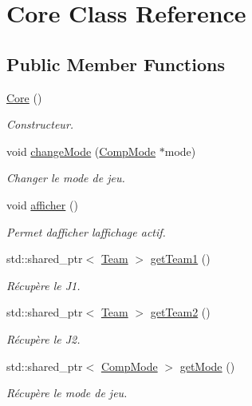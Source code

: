 \hypertarget{class_core}{}\section{Core Class Reference}
\label{class_core}
\subsection*{Public Member Functions}
\begin{DoxyCompactItemize}
\item 
\hyperlink{class_core_a14e63188e0aa7c4a6f72d5501384d1f9}{Core} ()
\begin{DoxyCompactList}\small\item\em Constructeur. \end{DoxyCompactList}\item 
void \hyperlink{class_core_aefcf76351ec813fb99f39fbcce42afac}{change\+Mode} (\hyperlink{class_comp_mode}{Comp\+Mode} $\ast$mode)
\begin{DoxyCompactList}\small\item\em Changer le mode de jeu. \end{DoxyCompactList}\item 
void \hyperlink{class_core_aeb0646c87941a9120d85bbe3f5fb8700}{afficher} ()
\begin{DoxyCompactList}\small\item\em Permet d\textquotesingle{}afficher l\textquotesingle{}affichage actif. \end{DoxyCompactList}\item 
std\+::shared\+\_\+ptr$<$ \hyperlink{class_team}{Team} $>$ \hyperlink{class_core_ab8696ef45b3d2d52ffbbe8a591dc99fb}{get\+Team1} ()
\begin{DoxyCompactList}\small\item\em Récupère le J1. \end{DoxyCompactList}\item 
std\+::shared\+\_\+ptr$<$ \hyperlink{class_team}{Team} $>$ \hyperlink{class_core_ae2a1b22acb1cc7a021c279b22e5c1cc1}{get\+Team2} ()
\begin{DoxyCompactList}\small\item\em Récupère le J2. \end{DoxyCompactList}\item 
std\+::shared\+\_\+ptr$<$ \hyperlink{class_comp_mode}{Comp\+Mode} $>$ \hyperlink{class_core_ae18939eeb844be8ec6960af11ddc31db}{get\+Mode} ()
\begin{DoxyCompactList}\small\item\em Récupère le mode de jeu. \end{DoxyCompactList}\item 

\end{DoxyCompactItemize}
